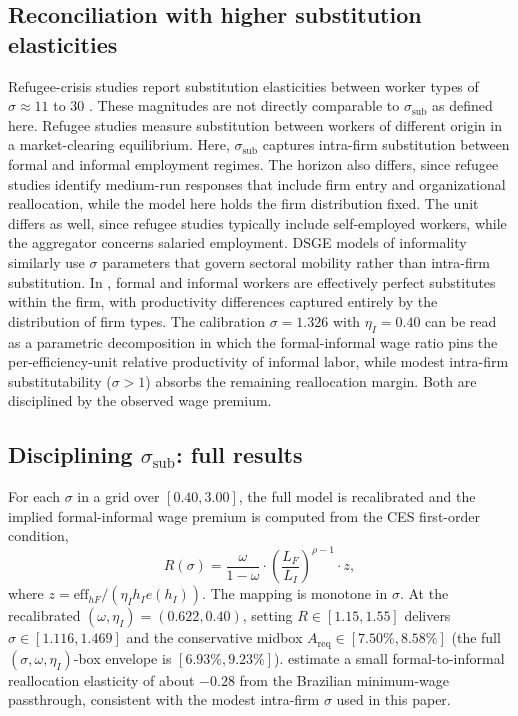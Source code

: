 \documentclass[12pt,a4paper]{article}
\begin{document}
\subsection{Reconciliation with higher substitution elasticities}\label{app:sigma_discussion}

Refugee-crisis studies report substitution elasticities between worker types of $\sigma\approx 11$ to $30$ \citep{OttavianoPeri2012, BaharDiTellaGulek2025}. These magnitudes are not directly comparable to $\sigma_{\text{sub}}$ as defined here. Refugee studies measure substitution between workers of different origin in a market-clearing equilibrium. Here, $\sigma_{\text{sub}}$ captures intra-firm substitution between formal and informal employment regimes. The horizon also differs, since refugee studies identify medium-run responses that include firm entry and organizational reallocation, while the model here holds the firm distribution fixed. The unit differs as well, since refugee studies typically include self-employed workers, while the aggregator concerns salaried employment. DSGE models of informality \citep{LeyvaUrrutia2020, McKiernan2021} similarly use $\sigma$ parameters that govern sectoral mobility rather than intra-firm substitution. In \citet{Ulyssea2018}, formal and informal workers are effectively perfect substitutes within the firm, with productivity differences captured entirely by the distribution of firm types. The calibration $\sigma=1.326$ with $\eta_I=0.40$ can be read as a parametric decomposition in which the formal-informal wage ratio pins the per-efficiency-unit relative productivity of informal labor, while modest intra-firm substitutability ($\sigma>1$) absorbs the remaining reallocation margin. Both are disciplined by the observed wage premium.

\subsection{Disciplining $\sigma_{\text{sub}}$: full results}

For each $\sigma$ in a grid over $[0.40,3.00]$, the full model is recalibrated and the implied formal-informal wage premium is computed from the CES first-order condition,
\[
R(\sigma)=\frac{\omega}{1-\omega}\cdot\left(\frac{L_F}{L_I}\right)^{\rho-1}\cdot z,
\]
where $z=\text{eff}_{hF}/(\eta_I h_I e(h_I))$. The mapping is monotone in $\sigma$. At the recalibrated $(\omega,\eta_I)=(0.622,0.40)$, setting $R\in[1.15,1.55]$ delivers $\sigma\in[1.116,1.469]$ and the conservative midbox $A_{\text{req}}\in[7.50\%,8.58\%]$ (the full $(\sigma,\omega,\eta_I)$-box envelope is $[6.93\%,9.23\%]$). \citet{DerenoncourtGerardLagosMontialoux2025} estimate a small formal-to-informal reallocation elasticity of about $-0.28$ from the Brazilian minimum-wage passthrough, consistent with the modest intra-firm $\sigma$ used in this paper.
\end{document}
